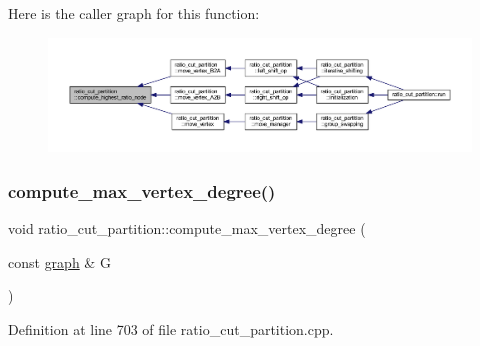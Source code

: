 Here is the caller graph for this function\+:\nopagebreak
\begin{figure}[H]
\begin{center}
\leavevmode
\includegraphics[width=350pt]{classratio__cut__partition_a11bd0644238997c99e7035507c709e50_icgraph}
\end{center}
\end{figure}
\mbox{\label{classratio__cut__partition_af83d8fc26a0836f4852af5f1db1aff5b}} 
\subsubsection{\texorpdfstring{compute\+\_\+max\+\_\+vertex\+\_\+degree()}{compute\_max\_vertex\_degree()}}
{\footnotesize\ttfamily void ratio\+\_\+cut\+\_\+partition\+::compute\+\_\+max\+\_\+vertex\+\_\+degree (\begin{DoxyParamCaption}\item[{const \mbox{\hyperlink{classgraph}{graph}} \&}]{G }\end{DoxyParamCaption})\hspace{0.3cm}{\ttfamily [protected]}}



Definition at line 703 of file ratio\+\_\+cut\+\_\+partition.\+cpp.



